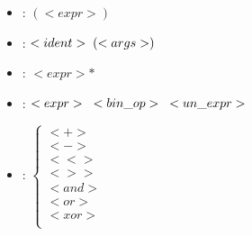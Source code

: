 \documentclass[12pt, a4paper]{article}
\begin{document}
\begin{itemize}
    \item{}
    :\hspace{\spacefromdefn}
    $(<expr>)$

    \item{}
    :\hspace{\spacefromdefn}
    $<ident> \hspace{1mm} (<args>)$

    \item{}
    :\hspace{\spacefromdefn}
    $<expr>*$

    \item{}
    :\hspace{\spacefromdefn}
    $<expr> \hspace{3mm} <bin\_op> \hspace{3mm} <un\_expr>$

    \item{}
    :\hspace{\spacefromdefn}
    \begin{math}
        \begin{cases}
            <+> \\
            <-> \\
            <<> \\
            <>> \\
            <and> \\
            <or> \\
            <xor> \\
        \end{cases}
    \end{math}
\end{itemize}
\end{document}
